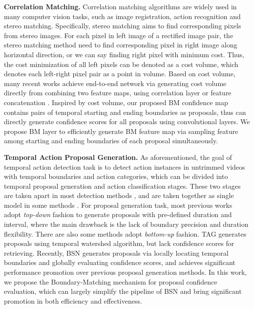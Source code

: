 \documentclass[10pt,twocolumn,letterpaper]{article}
\begin{document}
\noindent
\textbf{Correlation Matching.}
%
Correlation matching algorithms are widely used in many computer vision tasks, such as image registration, action recognition and stereo matching.
%
Specifically, stereo matching aims to find corresponding pixels from stereo images. For each pixel in left image of a rectified image pair, the stereo matching method need to find corresponding pixel in right image along horizontal direction, or we can say finding right pixel with minimum cost.
%
Thus, the cost minimization of all left pixels can be denoted as a cost volume, which denotes each left-right pixel pair as a point in volume.
%
Based on cost volume, many recent works \cite{song2018edgestereo,mayer2016large,liang2017learning} achieve end-to-end network via generating cost volume directly from combining two feature maps, using correlation layer \cite{mayer2016large} or feature concatenation \cite{chang2018pyramid}.
%
Inspired by cost volume, our proposed BM confidence map contains pairs of temporal starting and ending boundaries as proposals, thus can directly generate confidence scores for all proposals using convolutional layers.
%
We propose BM layer to efficiently generate BM feature map via sampling feature among starting and ending boundaries of each proposal simultaneously.



\noindent
\textbf{Temporal Action Proposal Generation.}
%
As aforementioned, the goal of temporal action detection task is to detect action instances in untrimmed videos with temporal boundaries and action categories, which can be divided into temporal proposal generation and action classification stages.
%
These two stages are taken apart in most detection methods \cite{shou2016action,singh2016untrimmed,zhao2017temporal}, and are taken together as single model in some methods \cite{ssad,sstad}.
%
For proposal generation task, most previous works \cite{sst_buch_cvpr17,fast_temporal_activity_cvpr16, escorcia2016daps, gao2017turn,shou2016action}  adopt \emph{top-down} fashion to generate proposals with pre-defined duration and interval, where the main drawback is the lack of boundary precision and duration flexibility.
%
There are also some methods \cite{zhao2017temporal,lin2018bsn} adopt \emph{bottom-up} fashion. TAG \cite{zhao2017temporal} generates proposals using temporal watershed algorithm, but lack confidence scores for retrieving. Recently, BSN \cite{lin2018bsn} generates proposals via locally locating temporal boundaries and globally evaluating confidence scores, and achieves significant performance promotion over previous proposal generation methods.
%
In this work, we propose the Boundary-Matching mechanism for proposal confidence evaluation, which can largely simplify the pipeline of BSN and bring significant promotion in both efficiency and effectiveness.
\end{document}
